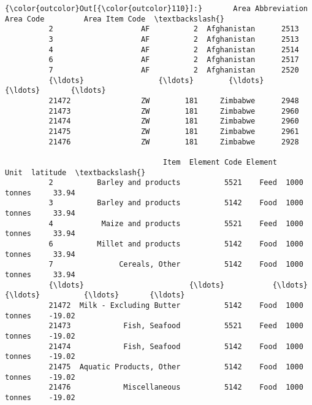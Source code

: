 \documentclass[11pt]{article}
\begin{document}
\begin{Verbatim}[commandchars=\\\{\}]
{\color{outcolor}Out[{\color{outcolor}110}]:}       Area Abbreviation  Area Code         Area Item Code  \textbackslash{}
          2                    AF          2  Afghanistan      2513   
          3                    AF          2  Afghanistan      2513   
          4                    AF          2  Afghanistan      2514   
          6                    AF          2  Afghanistan      2517   
          7                    AF          2  Afghanistan      2520   
          {\ldots}                 {\ldots}        {\ldots}          {\ldots}       {\ldots}   
          21472                ZW        181     Zimbabwe      2948   
          21473                ZW        181     Zimbabwe      2960   
          21474                ZW        181     Zimbabwe      2960   
          21475                ZW        181     Zimbabwe      2961   
          21476                ZW        181     Zimbabwe      2928   
          
                                    Item  Element Code Element         Unit  latitude  \textbackslash{}
          2          Barley and products          5521    Feed  1000 tonnes     33.94   
          3          Barley and products          5142    Food  1000 tonnes     33.94   
          4           Maize and products          5521    Feed  1000 tonnes     33.94   
          6          Millet and products          5142    Food  1000 tonnes     33.94   
          7               Cereals, Other          5142    Food  1000 tonnes     33.94   
          {\ldots}                        {\ldots}           {\ldots}     {\ldots}          {\ldots}       {\ldots}   
          21472  Milk - Excluding Butter          5142    Food  1000 tonnes    -19.02   
          21473            Fish, Seafood          5521    Feed  1000 tonnes    -19.02   
          21474            Fish, Seafood          5142    Food  1000 tonnes    -19.02   
          21475  Aquatic Products, Other          5142    Food  1000 tonnes    -19.02   
          21476            Miscellaneous          5142    Food  1000 tonnes    -19.02   
          

\end{Verbatim}
\end{document}
